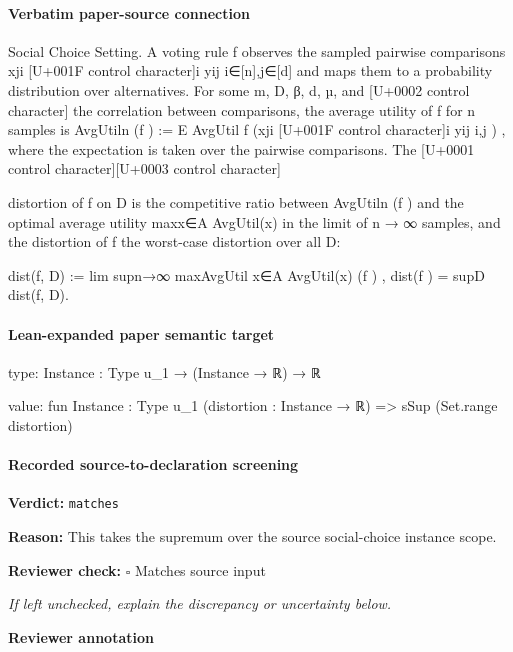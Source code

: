 \documentclass[10pt]{article}
\newcommand{\reviewerbox}{%
  \par\noindent\fbox{\parbox{0.96\linewidth}{\rule{0pt}{0.38in}}}\par
}
\newcommand{\reviewmatch}[1]{%
  \par\noindent\textbf{Reviewer check:} $\square$\; #1\par
  \noindent\emph{If left unchecked, explain the discrepancy or uncertainty below.}\par
}
\begin{document}
\paragraph{Verbatim paper-source connection}
\begin{ReviewVerbatim}
Social Choice Setting. A voting rule f observes the sampled pairwise comparisons {xji [U+001F control character]i
yij }i∈[n],j∈[d] and maps them to a probability distribution over alternatives. For some m, D, β, d, µ,
and
  [U+0002 control character] the correlation between comparisons,     the average utility of f for n samples is AvgUtiln (f ) :=
E AvgUtil f ({xji [U+001F control character]i yij }i,j ) , where the expectation is taken over the pairwise comparisons. The
                               [U+0001 control character][U+0003 control character]

distortion of f on D is the competitive ratio between AvgUtiln (f ) and the optimal average utility
maxx∈A AvgUtil(x) in the limit of n → ∞ samples, and the distortion of f the worst-case distortion
over all D:

            dist(f, D) := lim supn→∞ maxAvgUtil
                                        x∈A AvgUtil(x)
                                                (f )   ,               dist(f ) = supD dist(f, D).
\end{ReviewVerbatim}



\paragraph{Lean-expanded paper semantic target}
\begin{ReviewVerbatim}
type:
{Instance : Type u_1} → (Instance → ℝ) → ℝ

value:
fun {Instance : Type u_1} (distortion : Instance → ℝ) => sSup (Set.range distortion)
\end{ReviewVerbatim}


\paragraph{Recorded source-to-declaration screening}
\textbf{Verdict:} \texttt{matches}
\\
{\raggedright
\textbf{Reason:} This takes the supremum over the source social-\allowbreak{}choice instance scope.\allowbreak{}
\par}
\reviewmatch{Matches source input}
\noindent\textbf{Reviewer annotation}\par
\reviewerbox
\end{document}
